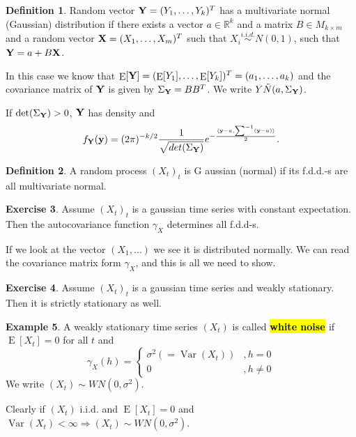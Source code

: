 \documentclass[12pt,a4paper, notitlepage]{book}
\newcommand{\hlc}[2][yellow]{ {\sethlcolor{#1} \hl{#2}} }
\newcommand{\hlcr}[1]{\hlc[lightred]{#1}}
\theoremstyle{definition} %
\newtheorem{definition}{Definition}[section]
\newtheorem{example}[definition]{Example}
\newtheorem{exercise}[definition]{Exercise}
\theoremstyle{plain} %
\newcommand{\R}{\mathbb R}
\DeclareMathOperator{\Var}{Var}
\DeclareMathOperator{\E}{E}
\newcommand{\New}[1]{ {\bf \hlcr{#1} } }
\begin{document}
\begin{definition}
Random vector ${\bf Y } = (Y_1, \dots, Y_k)^T$ has a multivariate normal (Gaussian) distribution if there exists a 
vector $a \in \R^k$ and a matrix $B \in M_{k\times m}$ and a random vector ${\bf X} = (X_1, \dots, X_m)^T$ such that $X_i 
\overset{i.i.d.}{\sim}  N(0,1)$, such that ${\bf Y} = a + B {\bf X}$.

In this case we know that $\E [ {\bf Y} ] = (\E [Y_1], \dots, \E [Y_k])^T = (a_1, \dots, a_k)$ and the covariance matrix of ${\bf Y}$ is given by $\Sigma_{\bf Y} = B B^T$.
We write $Y \tilde N(a, \Sigma_{\bf Y})$.

\end{definition}

If $ \det (\Sigma_{\bf Y}) > 0$, ${\bf Y}$ has density and 
\[ f_{\bf Y}({\bf y}) = (2 \pi)^{-k/2} \frac{1}{\sqrt{det(\Sigma_{\bf Y} ) } } e^{- \frac{ \langle{\bf y} - a, \sum^{-1}({\bf y} - a)\rangle}{2}}. \]

\begin{definition}
A random process $(X_t)_t$ is G aussian (normal) if its f.d.d.-s are all multivariate normal.
\end{definition} 


\begin{exercise}
Assume $(X_t)_t$ is a gaussian time series with constant expectation. Then the autocovariance function $\gamma_X$ determines all f.d.d-s.
\end{exercise}
\begin{hint}
If we look at the vector $(X_1, \dots)$ we see it is distributed normally. We can read the covariance matrix form $\gamma_X$, and this is all we need to show.
\end{hint}


\begin{exercise}
Assume $(X_t)_t$ is a gaussian time series and weakly stationary. Then it is strictly stationary as well. 
\end{exercise}


\begin{example}
A weakly stationary time series $(X_t)$ is called  \New{ white noise } if $\E [X_t] = 0$ for all $t$ and 
$$\gamma_X(h) =  \begin{cases} \sigma^2 ( = \Var(X_t)) & ,h = 0 \\
			0 & , h \neq 0 \end{cases}
$$
We write $(X_t) \sim WN(0, \sigma^2)$.

Clearly if $(X_t)$ i.i.d. and $ \E [X_t] = 0$ and $ \Var (X_t) < \infty \Rightarrow (X_t) \sim WN(0, \sigma^2)$.  
\end{example}
\end{document}

